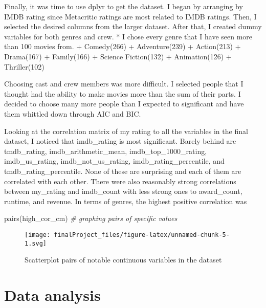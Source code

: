 \documentclass[
]{article}
\newenvironment{Shaded}{\begin{snugshade}}{\end{snugshade}}
\newcommand{\CommentTok}[1]{\textcolor[rgb]{0.56,0.35,0.01}{\textit{#1}}}
\newcommand{\FunctionTok}[1]{\textcolor[rgb]{0.00,0.00,0.00}{#1}}
\newcommand{\NormalTok}[1]{#1}
\begin{document}
Finally, it was time to use dplyr to get the dataset. I began by
arranging by IMDB rating since Metacritic ratings are most related to
IMDB ratings. Then, I selected the desired columns from the larger
dataset. After that, I created dummy variables for both genres and crew.
* I chose every genre that I have seen more than 100 movies from. +
Comedy(266) + Adventure(239) + Action(213) + Drama(167) + Family(166) +
Science Fiction(132) + Animation(126) + Thriller(102)

Choosing cast and crew members was more difficult. I selected people
that I thought had the ability to make movies more than the sum of their
parts. I decided to choose many more people than I expected to
significant and have them whittled down through AIC and BIC.

Looking at the correlation matrix of my rating to all the variables in
the final dataset, I noticed that imdb\_rating is most significant.
Barely behind are tmdb\_rating, imdb\_arithmetic\_mean,
imdb\_top\_1000\_rating, imdb\_us\_rating, imdb\_not\_us\_rating,
imdb\_rating\_percentile, and tmdb\_rating\_percentile. None of these
are surprising and each of them are correlated with each other. There
were also reasonably strong correlations between my\_rating and
imdb\_count with less strong ones to award\_count, runtime, and revenue.
In terms of genres, the highest positive correlation was

\begin{Shaded}
\begin{Highlighting}[]
\FunctionTok{pairs}\NormalTok{(high\_cor\_cm) }\CommentTok{\# graphing pairs of specific values}
\end{Highlighting}
\end{Shaded}

\begin{figure}
\centering
\texttt{[image: finalProject\_files/figure-latex/unnamed-chunk-5-1.svg]}
\caption{Scatterplot pairs of notable continuous variables in the
dataset}
\end{figure}

\hypertarget{data-analysis}{%
\section{Data analysis}\label{data-analysis}}
\end{document}
